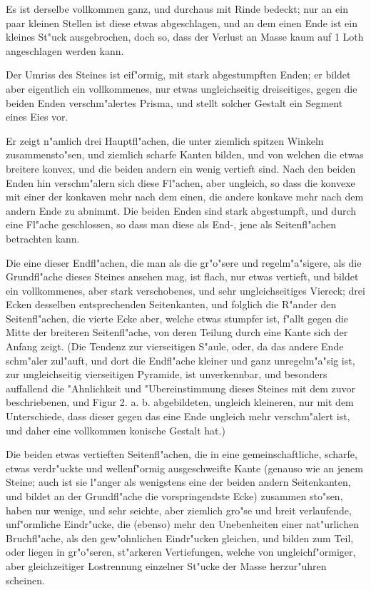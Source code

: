 \documentclass[a4paper, 11pt, oneside, german]{article}
\begin{document}
Es ist derselbe vollkommen ganz, und durchaus mit Rinde bedeckt; nur an ein paar kleinen Stellen ist diese etwas abgeschlagen, und an dem einen Ende ist ein kleines St"uck ausgebrochen, doch so, dass der Verlust an Masse kaum auf 1 Loth angeschlagen werden kann.

Der Umriss des Steines ist eif"ormig, mit stark abgestumpften Enden; er bildet aber eigentlich ein vollkommenes, nur etwas ungleichseitig dreiseitiges, gegen die beiden Enden verschm"alertes Prisma, und stellt solcher Gestalt ein Segment eines Eies vor.

Er zeigt n"amlich drei Hauptfl"achen, die unter ziemlich spitzen Winkeln zusammensto"sen, und ziemlich scharfe Kanten bilden, und von welchen die etwas breitere konvex, und die beiden andern ein wenig vertieft sind. Nach den beiden Enden hin verschm"alern sich diese Fl"achen, aber ungleich, so dass die konvexe mit einer der konkaven mehr nach dem einen, die andere konkave mehr nach dem andern Ende zu abnimmt. Die beiden Enden sind stark abgestumpft, und durch eine Fl"ache geschlossen, so dass man diese als End-, jene als Seitenfl"achen betrachten kann.

Die eine dieser Endfl"achen, die man als die gr"o"sere und regelm"a"sigere, als die Grundfl"ache dieses Steines ansehen mag, ist flach, nur etwas vertieft, und bildet ein vollkommenes, aber stark verschobenes, und sehr ungleichseitiges Viereck; drei Ecken desselben entsprechenden Seitenkanten, und folglich die R"ander den Seitenfl"achen, die vierte Ecke aber, welche etwas stumpfer ist, f"allt gegen die Mitte der breiteren Seitenfl"ache, von deren Teilung durch eine Kante sich der Anfang zeigt. (Die Tendenz zur vierseitigen S"aule, oder, da das andere Ende schm"aler zul"auft, und dort die Endfl"ache kleiner und ganz unregelm"a"sig ist, zur ungleichseitig vierseitigen Pyramide, ist unverkennbar, und besonders auffallend die "Ahnlichkeit und "Ubereinstimmung dieses Steines mit dem zuvor beschriebenen, und Figur 2. a. b. abgebildeten, ungleich kleineren, nur mit dem Unterschiede, dass dieser gegen das eine Ende ungleich mehr verschm"alert ist, und daher eine vollkommen konische Gestalt hat.)

Die beiden etwas vertieften Seitenfl"achen, die in eine gemeinschaftliche, scharfe, etwas verdr"uckte und wellenf"ormig ausgeschweifte Kante (genauso wie an jenem Steine; auch ist sie l"anger als wenigstens eine der beiden andern Seitenkanten, und bildet an der Grundfl"ache die vorspringendste Ecke) zusammen sto"sen, haben nur wenige, und sehr seichte, aber ziemlich gro"se und breit verlaufende, unf"ormliche Eindr"ucke, die (ebenso) mehr den Unebenheiten einer nat"urlichen Bruchfl"ache, als den gew"ohnlichen Eindr"ucken gleichen, und bilden zum Teil, oder liegen in gr"o"seren, st"arkeren Vertiefungen, welche von ungleichf"ormiger, aber gleichzeitiger Lostrennung einzelner St"ucke der Masse herzur"uhren scheinen.
\end{document}
